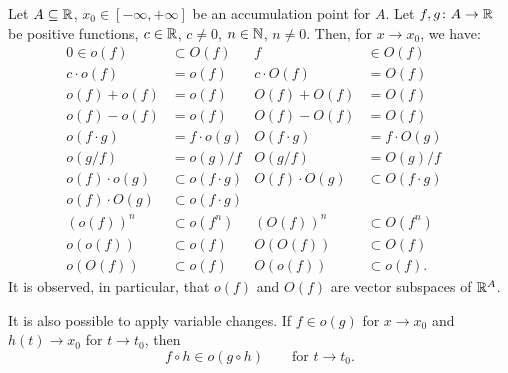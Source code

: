 \begin{theorem}
Let $A\subseteq {\mathbb R}$, $x_0\in [-\infty, +\infty]$ be an accumulation point for
$A$. Let $f,g \colon A \to {\mathbb R}$ be positive functions, $c\in {\mathbb R}$, $c\neq 0$,
$n\in {\mathbb N}$, $n\neq 0$. Then, for $x\to x_0$, we have:
\begin{align*}
0 \in o(f) &\subset O(f) & f&\in O(f)& \\
c \cdot o(f) &= o(f) & c \cdot O(f) &= O(f)\\
o(f)+o(f) &= o(f) & O(f)+O(f) &= O(f)\\
o(f)-o(f) &= o(f) & O(f)-O(f) &= O(f)\\
o(f\cdot g) &= f \cdot o(g) & O(f\cdot g) &= f\cdot O(g)\\
o(g/f) &= o(g) / f & O(g/f) &= O(g) / f\\
o(f)\cdot o(g) &\subset o(f\cdot g) & O(f)\cdot O(g) &\subset O(f\cdot g) \\
o(f)\cdot O(g) & \subset o(f\cdot g)&  & \\
(o(f))^n &\subset o(f^n) & (O(f))^n &\subset O(f^n)\\
o(o(f)) &\subset o(f) & O(O(f)) &\subset O(f)\\
o(O(f)) &\subset o(f) & O(o(f)) &\subset o(f)
.
\end{align*}
It is observed, in particular, that $o(f)$ and $O(f)$ are vector subspaces of
${\mathbb R}^A$.

It is also possible to apply variable changes.
If $f\in o(g)$ for $x\to x_0$ and $h(t) \to x_0$ for $t\to t_0$, then
\[
  f \circ h \in o(g\circ h) \qquad \text{for $t\to t_0$}.
\]
\end{theorem}
%
